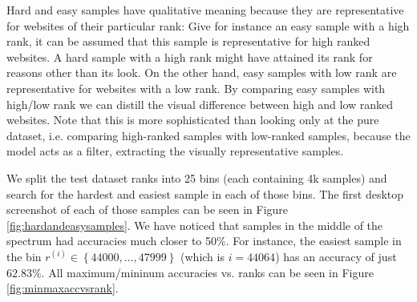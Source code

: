 Hard and easy samples have qualitative meaning because they are representative for websites of their particular rank: Give for instance an easy sample with a high rank, it can be assumed that this sample is representative for high ranked websites. A hard sample with a high rank might have attained its rank for reasons other than its look. On the other hand, easy samples with low rank are representative for websites with a low rank. By comparing easy samples with high/low rank we can distill the visual difference between high and low ranked websites. Note that this is more sophisticated than looking only at the pure dataset, i.e. comparing high-ranked samples with low-ranked samples, because the model acts as a filter, extracting the visually representative samples.

We split the test dataset ranks into 25 bins (each containing 4k samples) and search for the hardest and easiest sample in each of those bins. The first desktop screenshot of each of those samples can be seen in Figure \ref{fig:hardandeasysamples}. We have noticed that samples in the middle of the spectrum had accuracies much closer to 50\%. For instance, the easiest sample in the bin $r^{(i)}\in{\left\{44000, \dots, 47999\right\}}$ (which is $i=44064$) has an accuracy of just $62.83\%$. All maximum/mininum accuracies vs. ranks can be seen in Figure \ref{fig:minmaxaccvsrank}.

